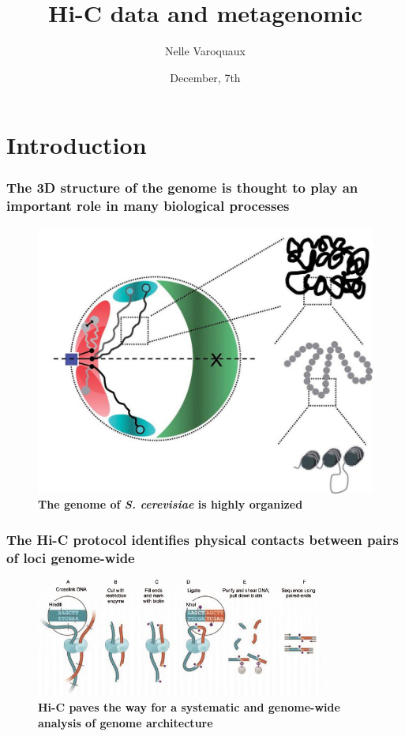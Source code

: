 \documentclass[xcolor=dvipsnames]{beamer}
\title{\textbf{Hi-C data and metagenomic}}
\author[Varoquaux Nelle]{
Nelle Varoquaux}
\date{December, 7th}
\institute{UC Berkeley, BIDS}
\begin{document}
\begin{frame}[t, noframenumbering]
  \maketitle

\end{frame}

\setcounter{framenumber}{0}

\section{Introduction}
\begin{frame}
\frametitle{The 3D structure of the genome is thought to play an important
role in many biological processes}
\vspace{-0.6em}
\begin{figure}
\begin{center}
\includegraphics[width=0.7\linewidth]{figures/yeasts_genome_architecture.jpg}
\end{center}
\caption{\textbf{The genome of \textit{S. cerevisiae} is highly organized}
         \citep{zimmer:principles}}
\end{figure}
\end{frame}

\begin{frame}
\frametitle{The Hi-C protocol identifies physical contacts between
pairs of loci genome-wide}
\begin{figure}
\centering
\includegraphics[width=0.85\textwidth]{figures/hic_protocol.jpg}
\caption{\textbf{Hi-C paves the way for a systematic and genome-wide analysis
of genome architecture} \citep{rao:3d}}
\end{figure}
\end{frame}
\end{document}
